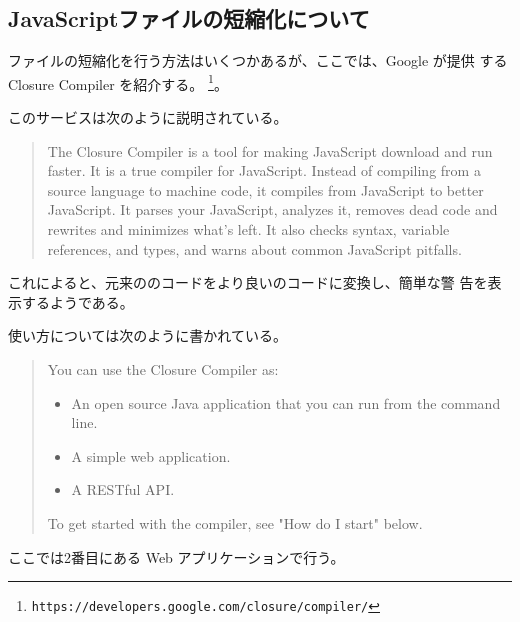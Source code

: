 \subsection{JavaScriptファイルの短縮化について}
\JS ファイルの短縮化を行う方法はいくつかあるが、ここでは、Google が提供
する Closure Compiler を紹介する。
\footnote{\texttt{https://developers.google.com/closure/compiler/}}。

このサービスは次のように説明されている。
\begin{quotation}
 The Closure Compiler is a tool for making JavaScript download and run
 faster. It is a true compiler for JavaScript. Instead of compiling from
 a source language to machine code, it compiles from JavaScript to
 better JavaScript. It parses your JavaScript, analyzes it, removes dead
 code and rewrites and minimizes what's left. It also checks syntax,
 variable references, and types, and warns about common JavaScript
 pitfalls. 
\end{quotation}
これによると、元来の\JS のコードをより良い\JS のコードに変換し、簡単な警
告を表示するようである。

使い方については次のように書かれている。
\begin{quotation}
 You can use the Closure Compiler as:

\begin{itemize}
 \item An open source Java application that you can run from the command
			 line.
 \item A simple web application.
 \item A RESTful API.
\end{itemize}
To get started with the compiler, see "How do I start" below.
\end{quotation}
ここでは2番目にある Web アプリケーションで行う。

